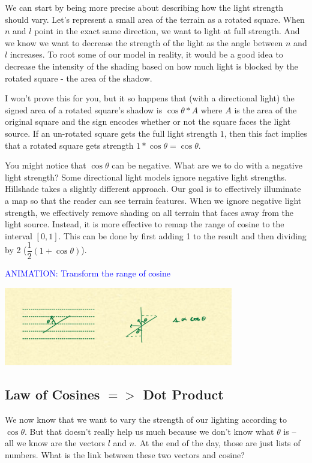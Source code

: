 \documentclass{article}
\newcommand\animation[1]{\textcolor{blue}{ANIMATION: #1}}
\begin{document}
We can start by being more precise about describing how the light strength should vary.
Let's represent a small area of the terrain as a rotated square.
When $n$ and $l$ point in the exact same direction, we want to light at full strength.
And we know we want to decrease the strength of the light as the angle between $n$ and $l$ increases.
To root some of our model in reality, it would be a good idea to decrease the intensity of the shading based on how much light is blocked by the rotated square - the area of the shadow.

I won't prove this for you, but it so happens that (with a directional light) the signed area of a rotated square's shadow is $\cos \theta * A$ where $A$ is the area of the original square and the sign encodes whether or not the square faces the light source.
If an un-rotated square gets the full light strength $1$, then this fact implies that a rotated square gets strength $1 * \cos \theta = \cos \theta$.

You might notice that $\cos \theta$ can be negative.
What are we to do with a negative light strength?
Some directional light models ignore negative light strengths.
Hillshade takes a slightly different approach.
Our goal is to effectively illuminate a map so that the reader can see terrain features.
When we ignore negative light strength, we effectively remove shading on all terrain that faces away from the light source.
Instead, it is more effective to remap the range of cosine to the interval $[0, 1]$.
This can be done by first adding 1 to the result and then dividing by 2 ($\dfrac{1}{2}(1 + \cos \theta)$).
 
\animation{Transform the range of cosine}

\begin{center}
	\includegraphics[width=0.75\textwidth,frame]{assets/cosine.jpg}
\end{center}

\subsection{Law of Cosines $=>$ Dot Product}

We now know that we want to vary the strength of our lighting according to $\cos \theta$.
But that doesn't really help us much because we don't know what $\theta$ is -- all we know are the vectors $l$ and $n$.
At the end of the day, those are just lists of numbers.
What is the link between these two vectors and cosine?
\end{document}
